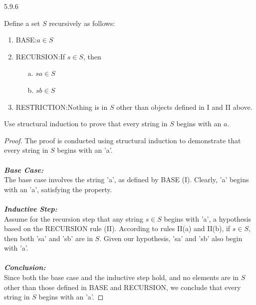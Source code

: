 \begin{question}
    {5.9.6}
    {
        Define a set $S$ recursively as follows:
        \vspace{-\baselineskip}
        \begin{enumerate}[label=\Roman*.]
            \item BASE:\@ $a \in S$
            \item RECURSION:\@ If $s \in S$, then
                \begin{enumerate}
                    \item[a.] $sa \in S$
                    \item[b.] $sb \in S$
                \end{enumerate}
            \item RESTRICTION:\@ Nothing is in $S$ other than objects defined in I and II above.
        \end{enumerate}
        \vspace{-\baselineskip}
        Use structural induction to prove that every string in $S$ begins with an $a$.
    }
\end{question}
\begin{proof}
    The proof is conducted using structural induction to demonstrate that every string in \(S\) begins with an 'a'. \\ \\
    \textbf{\textit{Base Case:}} \\
    The base case involves the string 'a', as defined by BASE (I). Clearly, 'a' begins with an 'a', satisfying the property. \\ \\
    \textbf{\textit{Inductive Step:}} \\
    Assume for the recursion step that any string \(s \in S\) begins with 'a', a hypothesis based on the RECURSION rule (II). According to rules II(a) and II(b), if \(s \in S\), then both 'sa' and 'sb' are in \(S\). Given our hypothesis, 'sa' and 'sb' also begin with 'a'.  \\ \\
    \textbf{\textit{Conclusion:}} \\
    Since both the base case and the inductive step hold, and no elements are in \(S\) other than those defined in BASE and RECURSION, we conclude that every string in \(S\) begins with an 'a'.
\end{proof}

